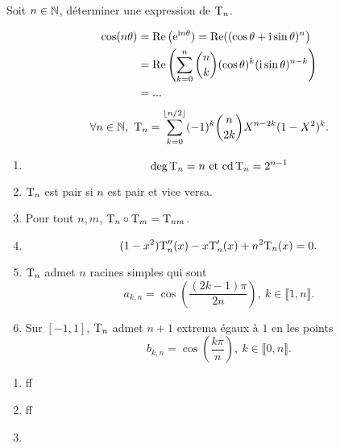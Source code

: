 
\begin{exercice}
    Soit $n \in \mathbb{N}$, déterminer une expression de $\mathrm{T}_n$.
\end{exercice}  

\begin{solution}
    \begin{align*}
        \cos(n \theta) &= \mathrm{Re} \left( \mathrm{e}^{\mathrm{i} n \theta}) = \mathrm{Re}((\cos \theta + \mathrm{i} \sin \theta)^n \right)\\
        &= \mathrm{Re}\left( \sum_{k=0}^n \binom{n}{k} (\cos\theta)^k (\mathrm{i} \sin\theta)^{n-k} \right) \\
        &= ...
    \end{align*}
    $$\forall n \in \N,\ \Tcheby_n = \sum_{k=0}^{\lfloor n / 2 \rfloor} (-1)^k \binom{n}{2k} X^{n-2k} (1-X^2)^k.$$
\end{solution}

\begin{prop}{}
    \begin{enumerate}
        \item $$\deg \mathrm{T}_n = n \text{ et } \mathrm{cd}\, \mathrm{T}_n = 2^{n-1}$$
        \item $\mathrm{T}_n$ est pair si $n$ est pair et vice versa. \\
        \item Pour tout $n, m$, $\mathrm{T}_n \circ \mathrm{T}_m = \mathrm{T}_{nm}$. \\
        \item $$(1-x^2) \mathrm{T}''_n(x) - x \mathrm{T}'_n(x) + n^2 \mathrm{T}_n(x) = 0.$$
        \item $\mathrm{T}_n$ admet $n$ racines simples qui sont
        $$a_{k,n} = \cos \left( \frac{(2k-1) \pi}{2n}\right),\ k \in \llbracket 1, n \rrbracket.$$
        \item Sur $[-1, 1]$, $\mathrm{T}_n$ admet $n+1$ extrema égaux à $1$ en les points
        $$b_{k,n} = \cos\left( \frac{k \pi}{n} \right),\ k \in \llbracket 0, n \rrbracket.$$
    \end{enumerate}
\end{prop}

\begin{preuve}
    \begin{enumerate}
        \item ff
        \item ff
        \item 
    \end{enumerate}
\end{preuve}

